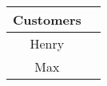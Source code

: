 \begin{tabular}{|c|c|}
    \hline
        \textbf{Customers} \\ \hline
        Henry \\ 
        Max  \\ \hline
\end{tabular}